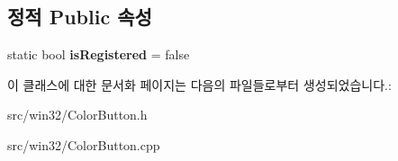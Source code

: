 \subsection*{정적 Public 속성}
\begin{DoxyCompactItemize}
\item 
\mbox{\label{class_color_button_a77e2fa25affb19cac1c18594d5bc478f}} 
static bool {\bfseries is\+Registered} = false
\end{DoxyCompactItemize}


이 클래스에 대한 문서화 페이지는 다음의 파일들로부터 생성되었습니다.\+:\begin{DoxyCompactItemize}
\item 
src/win32/Color\+Button.\+h\item 
src/win32/Color\+Button.\+cpp\end{DoxyCompactItemize}
